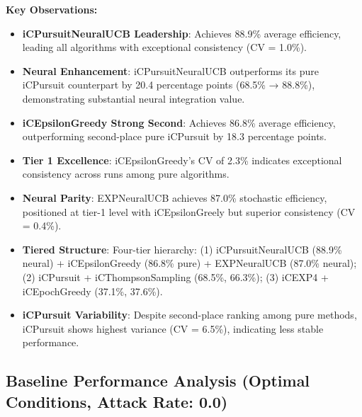 \documentclass[12pt,a4paper]{article}
\newcommand{\primarytext}[1]{\textcolor{primaryblue}{\textbf{#1}}}
\newcommand{\secondarytext}[1]{\textcolor{secondaryblue}{\textbf{#1}}}
\newcommand{\warning}[1]{\textcolor{warningred}{\textbf{#1}}}
\newcommand{\legacy}[1]{\textcolor{legacycolor}{\textbf{#1}}}
\newcommand{\neural}[1]{\textcolor{neuralcolor}{\textbf{#1}}}
\begin{document}
\begin{tcolorbox}[colback=tableheader,colframe=primaryblue,title=\textbf{Primary iCMAB Performance Results (Stochastic Environment, Attack Rate: 0.25)}]
\textbf{Key Observations:}
\begin{itemize}
\item \neural{iCPursuitNeuralUCB Leadership}: Achieves 88.9\% average efficiency, leading all algorithms with exceptional consistency (CV = 1.0\%).
\item \neural{Neural Enhancement}: iCPursuitNeuralUCB outperforms its pure iCPursuit counterpart by 20.4 percentage points (68.5\% → 88.8\%), demonstrating substantial neural integration value.
\item \primarytext{iCEpsilonGreedy Strong Second}: Achieves 86.8\% average efficiency, outperforming second-place pure iCPursuit by 18.3 percentage points.
\item \primarytext{Tier 1 Excellence}: iCEpsilonGreedy's CV of 2.3\% indicates exceptional consistency across runs among pure algorithms.
\item \legacy{Neural Parity}: EXPNeuralUCB achieves 87.0\% stochastic efficiency, positioned at tier-1 level with iCEpsilonGreely but superior consistency (CV = 0.4\%).
\item \secondarytext{Tiered Structure}: Four-tier hierarchy: (1) iCPursuitNeuralUCB (88.9\% neural) + iCEpsilonGreedy (86.8\% pure) + EXPNeuralUCB (87.0\% neural); (2) iCPursuit + iCThompsonSampling (68.5\%, 66.3\%); (3) iCEXP4 + iCEpochGreedy (37.1\%, 37.6\%).
\item \warning{iCPursuit Variability}: Despite second-place ranking among pure methods, iCPursuit shows highest variance (CV = 6.5\%), indicating less stable performance.
\end{itemize}
\end{tcolorbox}

\subsection{Baseline Performance Analysis (Optimal Conditions, Attack Rate: 0.0)}
\end{document}
